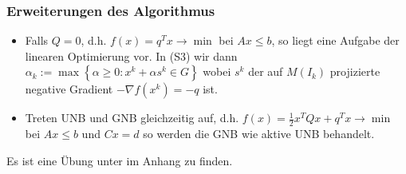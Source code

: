 \subsubsection{Erweiterungen des Algorithmus}
\begin{itemize}
  \item Falls $Q=0$, d.h. $f(x)=q^Tx\rightarrow\min$ bei $Ax\le b$, so liegt eine Aufgabe der linearen Optimierung vor. In (S3) wir dann $\alpha_k:=\max\left\{ \alpha\ge 0: x^k+\alpha
  s^k\in G \right\}$ wobei $s^k$ der auf $M(I_k)$ projizierte negative Gradient $-\nabla f(x^k)=-q$ ist.
  \item Treten UNB und GNB gleichzeitig auf, d.h. $f(x)=\frac12 x^TQx+q^Tx\rightarrow\min$ bei $Ax\le b$ und $Cx=d$ so werden die GNB wie aktive UNB behandelt.
\end{itemize}
Es ist eine Übung unter  im Anhang zu finden.
 
